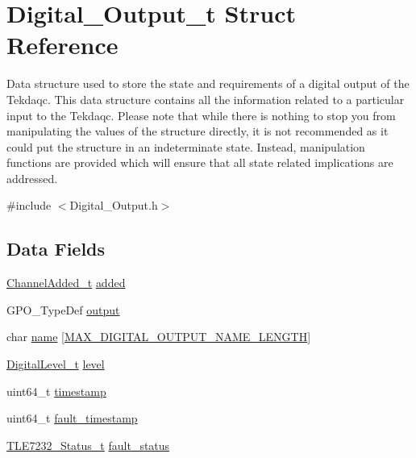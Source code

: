 \hypertarget{struct_digital___output__t}{\section{Digital\-\_\-\-Output\-\_\-t Struct Reference}
\label{struct_digital___output__t}
}


Data structure used to store the state and requirements of a digital output of the Tekdaqc. This data structure contains all the information related to a particular input to the Tekdaqc. Please note that while there is nothing to stop you from manipulating the values of the structure directly, it is not recommended as it could put the structure in an indeterminate state. Instead, manipulation functions are provided which will ensure that all state related implications are addressed.  




{\ttfamily \#include $<$Digital\-\_\-\-Output.\-h$>$}

\subsection*{Data Fields}
\begin{DoxyCompactItemize}
\item 
\hyperlink{group__board__channel__constants_gab0f30599ceb99e5ba3b2908d8e9bd131}{Channel\-Added\-\_\-t} \hyperlink{struct_digital___output__t_a6f1a4402ff8651dfc5e453b5e3154c2d}{added}
\item 
G\-P\-O\-\_\-\-Type\-Def \hyperlink{struct_digital___output__t_ac7a7d7f3d154ec3152de97d06a7870f1}{output}
\item 
char \hyperlink{struct_digital___output__t_af161017167d4afb064b9c104877041e9}{name} \mbox{[}\hyperlink{group__digital__output_ga95c04964ce488ee74ca3f32a39a88cb7}{M\-A\-X\-\_\-\-D\-I\-G\-I\-T\-A\-L\-\_\-\-O\-U\-T\-P\-U\-T\-\_\-\-N\-A\-M\-E\-\_\-\-L\-E\-N\-G\-T\-H}\mbox{]}
\item 
\hyperlink{group__board__channel__constants_gaee574a0d48c41a3e5426ffbf8ac4c5c4}{Digital\-Level\-\_\-t} \hyperlink{struct_digital___output__t_a077d2fbd9f466d58856071f5314b9c09}{level}
\item 
uint64\-\_\-t \hyperlink{struct_digital___output__t_a465bef81f6478756e5443025b1f2ddfa}{timestamp}
\item 
uint64\-\_\-t \hyperlink{struct_digital___output__t_ada3dca6ca3d8c61b00b0a2a65055c21e}{fault\-\_\-timestamp}
\item 
\hyperlink{group__tle7232__driver_ga84bb3f68b575c6add1c27f053b87746a}{T\-L\-E7232\-\_\-\-Status\-\_\-t} \hyperlink{struct_digital___output__t_a13ee06338665fcdab36b11e8c7b7df0e}{fault\-\_\-status}
\end{DoxyCompactItemize}


